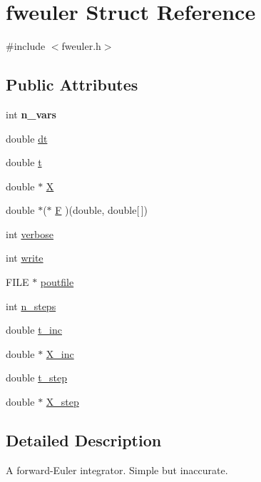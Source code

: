 \hypertarget{structfweuler}{}\section{fweuler Struct Reference}
\label{structfweuler}


{\ttfamily \#include $<$fweuler.\+h$>$}

\subsection*{Public Attributes}
\begin{DoxyCompactItemize}
\item 
\hypertarget{structfweuler_a79f8c4cfdb9adfa253c8b4c037c237f8}{}int {\bfseries n\+\_\+vars}\label{structfweuler_a79f8c4cfdb9adfa253c8b4c037c237f8}

\item 
double \hyperlink{structfweuler_aaaa8f46ce07dde8c2f1d3fbb0097d166}{dt}
\item 
double \hyperlink{structfweuler_ab00dd0addf40e99c6abe9e65f5e140d5}{t}
\item 
double $\ast$ \hyperlink{structfweuler_ae6a7a8f3084e4a42a4c7da4c4a36dcc0}{X}
\item 
double $\ast$($\ast$ \hyperlink{structfweuler_aa4e9973fa09e3f186f5bf3e0c7ae2c2e}{F} )(double, double\mbox{[}$\,$\mbox{]})
\item 
int \hyperlink{structfweuler_a71969341520cf6b76abcc298471743da}{verbose}
\item 
int \hyperlink{structfweuler_a6f9c2735d7a016c50a343b17cde41d5d}{write}
\item 
F\+I\+L\+E $\ast$ \hyperlink{structfweuler_ad2d6e50980d4a77a79652527c36d03ab}{poutfile}
\item 
int \hyperlink{structfweuler_a3ed5377d7609cbeef32422ad5662ab62}{n\+\_\+steps}
\item 
double \hyperlink{structfweuler_a24bbdf908ad0e3997194b2f9901a93e4}{t\+\_\+inc}
\item 
double $\ast$ \hyperlink{structfweuler_abb379c1efee260436de2484366a53c47}{X\+\_\+inc}
\item 
double \hyperlink{structfweuler_a34810f998eae03fbeaa53d37b73ec366}{t\+\_\+step}
\item 
double $\ast$ \hyperlink{structfweuler_aceb1a0fdb7cb920512268ff3031b70dd}{X\+\_\+step}
\end{DoxyCompactItemize}


\subsection{Detailed Description}
A forward-\/\+Euler integrator. Simple but inaccurate. 

